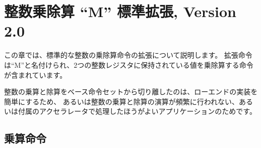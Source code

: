 \begin{comment}
\chapter{``M'' Standard Extension for Integer Multiplication and
  Division, Version 2.0}
\end{comment}
\chapter{整数乗除算 ``M'' 標準拡張, Version 2.0}

\begin{comment}
This chapter describes the standard integer multiplication and
division instruction extension, which is named ``M'' and contains
instructions that multiply or divide values held in two integer
registers.
\end{comment}

この章では、標準的な整数の乗除算命令の拡張について説明します。
拡張命令は``M''と名付けられ、2つの整数レジスタに保持されている値を乗除算する命令が含まれています。

\begin{commentary}
\begin{comment}
We separate integer multiply and divide out from the base to simplify
low-end implementations, or for applications where integer multiply
and divide operations are either infrequent or better handled in
attached accelerators.
\end{comment}
整数の乗算と除算をベース命令セットから切り離したのは、ローエンドの実装を簡単にするため、
あるいは整数の乗算と除算の演算が頻繁に行われない、あるいは付属のアクセラレータで処理したほうがよいアプリケーションのためです。
\end{commentary}

\begin{comment}
\section{Multiplication Operations}
\end{comment}
\section{乗算命令}

